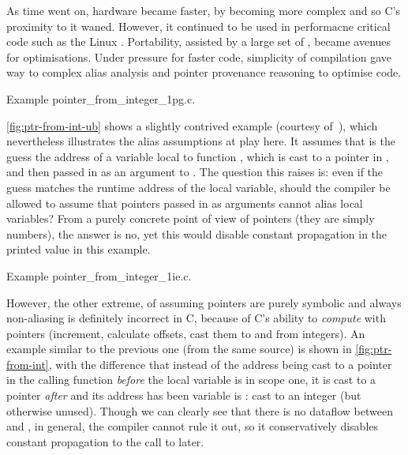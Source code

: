 As time went on, hardware became faster, by becoming more complex and so C's
proximity to it waned. However, it continued to be used in performacne critical
code such as the Linux . Portability, assisted by a large set of
, became avenues for optimisations. Under pressure for faster code,
simplicity of compilation gave way to complex alias analysis and pointer
provenance reasoning to optimise code.

\begin{marginfigure}
    \centering
    \caption{Example pointer\_from\_integer\_1pg.c.}\label{fig:ptr-from-int-ub}
\end{marginfigure}%

\cref{fig:ptr-from-int-ub} shows a slightly contrived example (courtesy
of~), which nevertheless illustrates the
alias assumptions at play here. It assumes that  is
the guess the address of a variable local to function , which is
cast to a pointer in , and then passed in as an argument to
. The question this raises is: even if the guess matches the runtime
address of the local variable, should the compiler be allowed to assume that
pointers passed in as arguments cannot alias local variables? From a purely
concrete point of view of pointers (they are simply numbers), the answer is no,
yet this would disable constant propagation in the printed value in this
example.

\begin{marginfigure}
    \centering
    \caption{Example pointer\_from\_integer\_1ie.c.}\label{fig:ptr-from-int}
\end{marginfigure}%

However, the other extreme, of assuming pointers are purely symbolic and always
non-aliasing is definitely incorrect in C, because of C's ability to
\emph{compute} with pointers (increment, calculate offsets, cast them to and
from integers). An example similar to the previous one (from the same source)
is shown in \cref{fig:ptr-from-int}, with the difference that instead of the
address being cast to a pointer in the calling function \emph{before} the local
variable is in scope one, it is cast to a pointer \emph{after} and its address
has been variable is : cast to an integer (but otherwise
unused). Though we can clearly see that there is no dataflow between
 and , in general, the compiler cannot rule it out, so it
conservatively disables constant propagation to the call to 
later.

